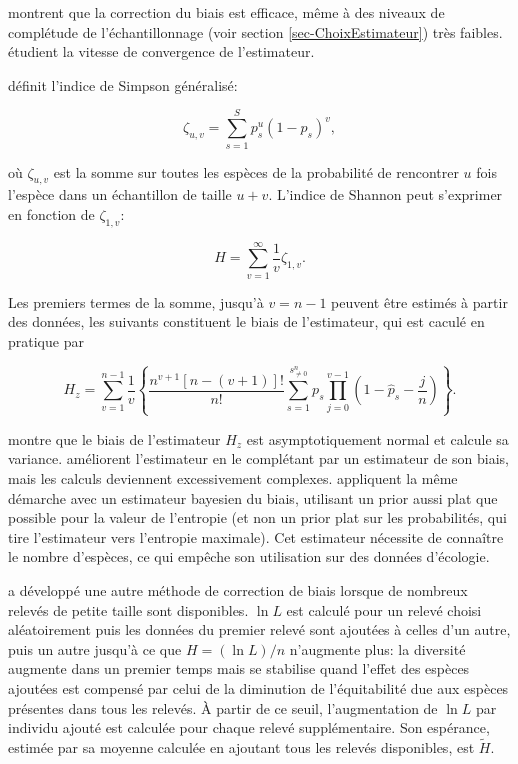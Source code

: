 \documentclass[
  11pt,
  french,
  a4paper,
  extrafontsizes,onecolumn,openright
  ]{memoir}
\begin{document}
\textcite{Beck2010} montrent que la correction du biais est efficace, même à des niveaux de complétude de l'échantillonnage (voir section \ref{sec-ChoixEstimateur}) très faibles. \textcite{Vu2007} étudient la vitesse de convergence de l'estimateur.

\textcite{Zhang2012} définit l'indice de Simpson généralisé:

\begin{equation}
  \label{eq:zeta}
  \zeta_{u,v} = \sum^S_{s=1}{p^u_s{\left(1-p_s\right)}^v},
\end{equation}

où \(\zeta_{u,v}\) est la somme sur toutes les espèces de la probabilité de rencontrer \(u\) fois l'espèce dans un échantillon de taille \(u+v\).
L'indice de Shannon peut s'exprimer en fonction de \(\zeta_{1,v}\):

\begin{equation}
  \label{eq:HzetaInf}
  H = \sum^{\infty}_{v=1}{\frac{1}{v} \zeta_{1,v}}.
\end{equation}

Les premiers termes de la somme, jusqu'à \(v=n-1\) peuvent être estimés à partir des données, les suivants constituent le biais de l'estimateur, qui est caculé en pratique par

\begin{equation}
  \label{eq:Hzetanu}
  H_z = \sum^{n-1}_{v=1}{\frac{1}{v}\left\{\frac{n^{v+1}\left[n-\left(v+1\right)\right]!}{n!}\sum^{s^{n}_{\ne 0}}_{s=1}{p_s\prod^{v-1}_{j=0}{\left(1-{\hat{p}}_s-\frac{j}{n}\right)}}\right\}}.
\end{equation}

\textcite{Zhang2013a} montre que le biais de l'estimateur \(H_z\) est asymptotiquement normal et calcule sa variance.
\textcite{Zhang2013} améliorent l'estimateur en le complétant par un estimateur de son biais, mais les calculs deviennent excessivement complexes.
\textcite{Vinck2012} appliquent la même démarche avec un estimateur bayesien du biais, utilisant un prior aussi plat que possible pour la valeur de l'entropie (et non un prior plat sur les probabilités, qui tire l'estimateur vers l'entropie maximale).
Cet estimateur nécessite de connaître le nombre d'espèces, ce qui empêche son utilisation sur des données d'écologie.

\textcite{Pielou1966} a développé une autre méthode de correction de biais lorsque de nombreux relevés de petite taille sont disponibles.
\(\ln{L}\) est calculé pour un relevé choisi aléatoirement puis les données du premier relevé sont ajoutées à celles d'un autre, puis un autre jusqu'à ce que \(H=(\ln{L})/{n}\) n'augmente plus: la diversité augmente dans un premier temps mais se stabilise quand l'effet des espèces ajoutées est compensé par celui de la diminution de l'équitabilité due aux espèces présentes dans tous les relevés.
À partir de ce seuil, l'augmentation de \(\ln{L}\) par individu ajouté est calculée pour chaque relevé supplémentaire.
Son espérance, estimée par sa moyenne calculée en ajoutant tous les relevés disponibles, est \(\tilde{H}\).
\end{document}

